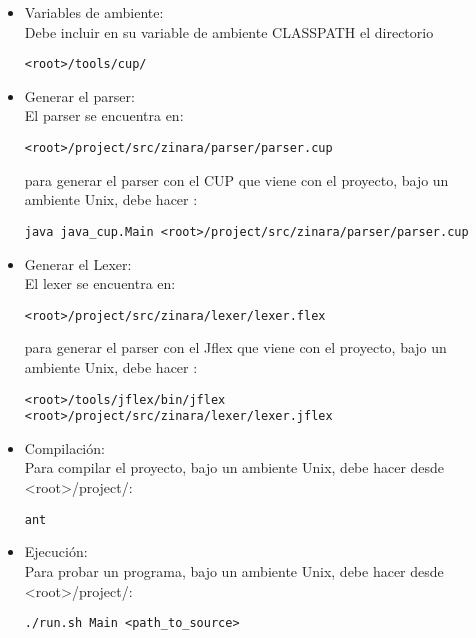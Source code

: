 \documentclass[12pt, spanish]{report}
\begin{document}
\begin{itemize}
\item Variables de ambiente:\\
\indent Debe incluir en su variable de ambiente CLASSPATH el directorio
\begin{verbatim}
<root>/tools/cup/
\end{verbatim}

\item Generar el parser:\\
\indent El parser se encuentra en:\\
\begin{verbatim}
<root>/project/src/zinara/parser/parser.cup
\end{verbatim}
para generar el parser con el CUP que viene con el proyecto, bajo un ambiente Unix, debe hacer :\\
\begin{verbatim}
java java_cup.Main <root>/project/src/zinara/parser/parser.cup
\end{verbatim}

\item Generar el Lexer:\\
\indent El lexer se encuentra en:\\
\begin{verbatim}
<root>/project/src/zinara/lexer/lexer.flex
\end{verbatim}
para generar el parser con el Jflex que viene con el proyecto, bajo un ambiente Unix, debe hacer :\\
\begin{verbatim}
<root>/tools/jflex/bin/jflex <root>/project/src/zinara/lexer/lexer.jflex
\end{verbatim}

\item Compilaci\'on:\\
\indent Para compilar el proyecto, bajo un ambiente Unix, debe hacer desde <root>/project/:\\
\begin{verbatim}
ant
\end{verbatim}

\item Ejecuci\'on:\\
\indent Para probar un programa, bajo un ambiente Unix, debe hacer desde <root>/project/:\\
\begin{verbatim}
./run.sh Main <path_to_source>
\end{verbatim}
\end{itemize}
\end{document}
